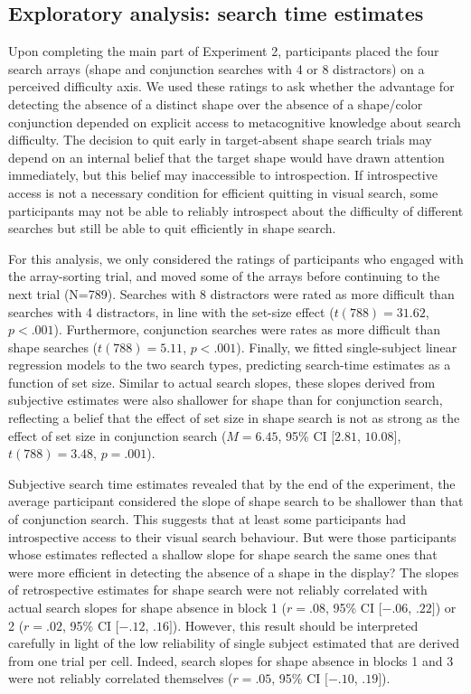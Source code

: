 \documentclass[
  english,
  man]{apa6}
\begin{document}
\hypertarget{exploratory-analysis-search-time-estimates}{%
\subsection{Exploratory analysis: search time estimates}\label{exploratory-analysis-search-time-estimates}}

Upon completing the main part of Experiment 2, participants placed the four search arrays (shape and conjunction searches with 4 or 8 distractors) on a perceived difficulty axis. We used these ratings to ask whether the advantage for detecting the absence of a distinct shape over the absence of a shape/color conjunction depended on explicit access to metacognitive knowledge about search difficulty. The decision to quit early in target-absent shape search trials may depend on an internal belief that the target shape would have drawn attention immediately, but this belief may inaccessible to introspection. If introspective access is not a necessary condition for efficient quitting in visual search, some participants may not be able to reliably introspect about the difficulty of different searches but still be able to quit efficiently in shape search.

For this analysis, we only considered the ratings of participants who engaged with the array-sorting trial, and moved some of the arrays before continuing to the next trial (N=789). Searches with 8 distractors were rated as more difficult than searches with 4 distractors, in line with the set-size effect (\(t(788) = 31.62\), \(p < .001\)). Furthermore, conjunction searches were rates as more difficult than shape searches (\(t(788) = 5.11\), \(p < .001\)). Finally, we fitted single-subject linear regression models to the two search types, predicting search-time estimates as a function of set size. Similar to actual search slopes, these slopes derived from subjective estimates were also shallower for shape than for conjunction search, reflecting a belief that the effect of set size in shape search is not as strong as the effect of set size in conjunction search (\(M = 6.45\), 95\% CI \([2.81\), \(10.08]\), \(t(788) = 3.48\), \(p = .001\)).

Subjective search time estimates revealed that by the end of the experiment, the average participant considered the slope of shape search to be shallower than that of conjunction search. This suggests that at least some participants had introspective access to their visual search behaviour. But were those participants whose estimates reflected a shallow slope for shape search the same ones that were more efficient in detecting the absence of a shape in the display? The slopes of retrospective estimates for shape search were not reliably correlated with actual search slopes for shape absence in block 1 (\(r = .08\), 95\% CI \([-.06\), \(.22]\)) or 2 (\(r = .02\), 95\% CI \([-.12\), \(.16]\)). However, this result should be interpreted carefully in light of the low reliability of single subject estimated that are derived from one trial per cell. Indeed, search slopes for shape absence in blocks 1 and 3 were not reliably correlated themselves (\(r = .05\), 95\% CI \([-.10\), \(.19]\)).
\end{document}
